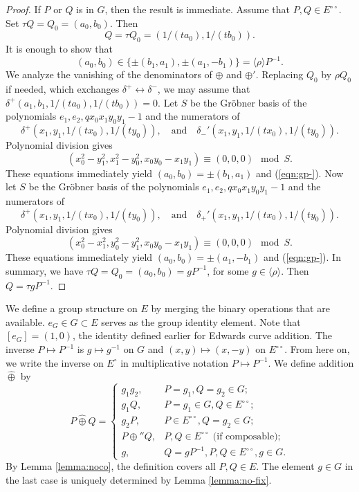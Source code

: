 \documentclass[18pt]{article}
\newcommand{\Eo}{E^\circ}
\newcommand{\Eoo}{E^{\circ\circ}}
\newcommand{\hplus}{\hat\oplus}
\newcommand{\Go}{\langle\rho\rangle}
\def\cong{\equiv}
\begin{document}
\begin{proof} If $P$ or $Q$ is in $G$, then the result is immediate.
  Assume that $P,Q\in \Eoo$.  Set $\tau Q = Q_0 = (a_0,b_0)$. Then
\[
Q = \tau Q_0 = (1/(t a_0),1/(t b_0)).
\]
It is enough to show that
\begin{equation}\label{eqn:gp-}
(a_0,b_0) \in \{\pm (b_1,a_1),\pm (a_1,-b_1)\} = \Go P^{-1}.
\end{equation}
We analyze the vanishing of the denominators of $\oplus$ and
$\oplus'$.  Replacing $Q_0$ by $\rho Q_0$ if needed, which exchanges
$\delta^+\leftrightarrow \delta^-$, we may assume that
$\delta^+(a_1,b_1,1/(t a_0),1/(t b_0))=0$.  Let $S$ be the Gr\"obner
basis of the polynomials $e_1,e_2, q x_0 x_1 y_0 y_1 - 1$ and the
numerators of
\[
\delta^+(x_1,y_1,1/(t x_0),1/(t y_0)),\quad \text{and}\quad
\delta_-'(x_1,y_1,1/(t x_0),1/(t y_0)).
\]
Polynomial division gives
\[
(x_0^2-y_1^2,x_1^2-y_0^2,x_0 y_0 - x_1 y_1) \cong (0,0,0) \mod S.
\]
These equations immediately yield $(a_0,b_0) = \pm (b_1,a_1)$ and
(\ref{eqn:gp-}).  Now let $S$ be the Gr\"obner basis of the polynomials
$e_1,e_2, q x_0 x_1 y_0 y_1 - 1$ and the numerators of
\[
\delta^+(x_1,y_1,1/(t x_0),1/(t y_0)),\quad \text{and}\quad
\delta_+'(x_1,y_1,1/(t x_0),1/(t y_0)).
\]
Polynomial division gives
\[
(x_0^2-x_1^2,y_0^2-y_1^2,x_0 y_0 - x_1 y_1) \cong (0,0,0) \mod S.
\]
These equations immediately yield $(a_0,b_0) = \pm (a_1,-b_1)$ and
(\ref{eqn:gp-}).  In summary, we have $\tau Q = Q_0 = (a_0,b_0) = g
P^{-1}$, for some $g\in \Go$.  Then $Q = \tau g P^{-1}$.
\end{proof}

We define a group structure on $E$ by merging the binary operations
that are available.  $e_G\in G\subset E$ serves as the group identity
element.  Note that $[e_G] = (1,0)$, the identity defined earlier for
Edwards curve addition.  The inverse $P\mapsto P^{-1}$ is $g\mapsto
g^{-1}$ on $G$ and $(x,y)\mapsto (x,-y)$ on $\Eoo$.  From here on, we
write the inverse on $\Eo$ in multiplicative notation $P\mapsto
P^{-1}$.  We define addition $\hplus$ by
\begin{equation}
P\hplus Q = \begin{cases}
g_1 g_2,& P = g_1, Q = g_2 \in G;\\
g_1 Q,& P = g_1\in G,  Q\in \Eoo;\\
g_2 P,& P \in \Eoo, Q = g_2\in G;\\
P\oplus'' Q,& P,Q\in \Eoo \text{ (if composable)};\\
g,& Q = g P^{-1}, P,Q\in \Eoo, g\in G.
\end{cases}
\end{equation}
By Lemma \ref{lemma:noco}, the definition covers all $P,Q\in E$.  The
element $g\in G$ in the last case is uniquely determined by Lemma
\ref{lemma:no-fix}.
\end{document}
